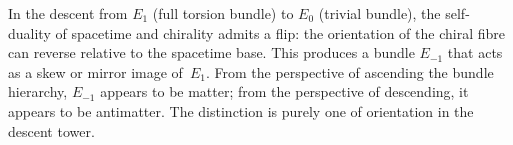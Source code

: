 \begin{remark}
\label{rem:e-minus-one}
In the descent from $E_1$ (full torsion bundle) to $E_0$ (trivial
bundle), the self-duality of spacetime and chirality admits a flip: the
orientation of the chiral fibre can reverse relative to the spacetime
base.  This produces a bundle $E_{-1}$ that acts as a skew or mirror
image of~$E_1$.  From the perspective of ascending the bundle hierarchy,
$E_{-1}$ appears to be matter; from the perspective of descending, it
appears to be antimatter.  The distinction is purely one of orientation
in the descent tower.
\end{remark}
